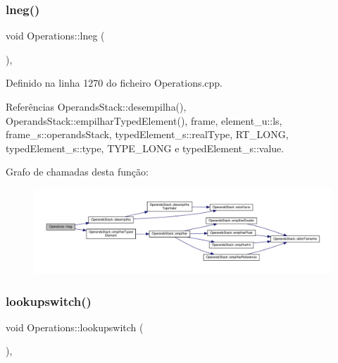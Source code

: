\subsubsection{\texorpdfstring{lneg()}{lneg()}}
{\footnotesize\ttfamily void Operations\+::lneg (\begin{DoxyParamCaption}{ }\end{DoxyParamCaption})\hspace{0.3cm}{\ttfamily [static]}, {\ttfamily [private]}}



Definido na linha 1270 do ficheiro Operations.\+cpp.



Referências Operands\+Stack\+::desempilha(), Operands\+Stack\+::empilhar\+Typed\+Element(), frame, element\+\_\+u\+::ls, frame\+\_\+s\+::operands\+Stack, typed\+Element\+\_\+s\+::real\+Type, R\+T\+\_\+\+L\+O\+NG, typed\+Element\+\_\+s\+::type, T\+Y\+P\+E\+\_\+\+L\+O\+NG e typed\+Element\+\_\+s\+::value.

Grafo de chamadas desta função\+:
\nopagebreak
\begin{figure}[H]
\begin{center}
\leavevmode
\includegraphics[width=350pt]{classOperations_a0a14cc7ee880b5d5f1c3b532e8e2117c_cgraph}
\end{center}
\end{figure}
\mbox{\label{classOperations_a0458ee466daff63a3698973c89cfe71a}} 
\subsubsection{\texorpdfstring{lookupswitch()}{lookupswitch()}}
{\footnotesize\ttfamily void Operations\+::lookupswitch (\begin{DoxyParamCaption}{ }\end{DoxyParamCaption})\hspace{0.3cm}{\ttfamily [static]}, {\ttfamily [private]}}



